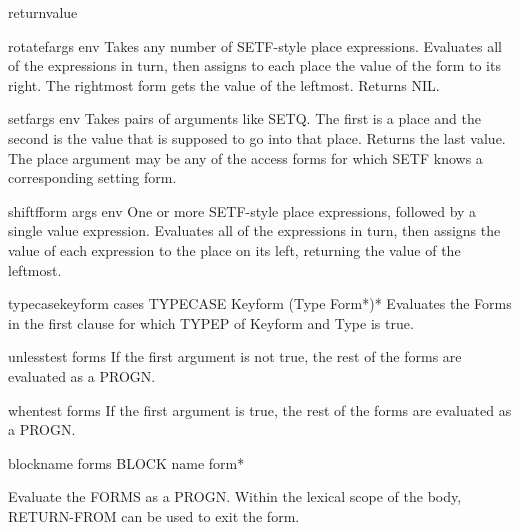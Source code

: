 \begin{macro}{return}{\op value}{}{}
  
\end{macro}

\begin{macro}{rotatef}{\rest args \env env}{}{}
  Takes any number of SETF-style place expressions. Evaluates all of the
   expressions in turn, then assigns to each place the value of the form to
   its right. The rightmost form gets the value of the leftmost.
   Returns NIL.
\end{macro}

\begin{macro}{setf}{\rest args \env env}{}{}
  Takes pairs of arguments like SETQ. The first is a place and the second
  is the value that is supposed to go into that place. Returns the last
  value. The place argument may be any of the access forms for which SETF
  knows a corresponding setting form.
\end{macro}

\begin{macro}{shiftf}{\whole form \rest args \env env}{}{}
  One or more SETF-style place expressions, followed by a single
   value expression. Evaluates all of the expressions in turn, then
   assigns the value of each expression to the place on its left,
   returning the value of the leftmost.
\end{macro}

\begin{macro}{typecase}{keyform \body cases}{}{}
  TYPECASE Keyform {(Type Form*)}*
  Evaluates the Forms in the first clause for which TYPEP of Keyform and Type
  is true.
\end{macro}

\begin{macro}{unless}{test \body forms}{}{}
  If the first argument is not true, the rest of the forms are
evaluated as a PROGN.
\end{macro}

\begin{macro}{when}{test \body forms}{}{}
  If the first argument is true, the rest of the forms are
evaluated as a PROGN.
\end{macro}

\begin{specialop}{block}{name \rest forms}{}{}
  BLOCK name form*

Evaluate the FORMS as a PROGN. Within the lexical scope of the body,
RETURN-FROM can be used to exit the form.
\end{specialop}

